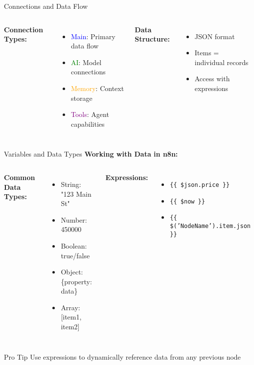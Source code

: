 \documentclass{beamer}
\begin{document}
\begin{frame}{Connections and Data Flow}
  \begin{columns}[onlytextwidth]
      \textbf{Connection Types:}
      \begin{itemize}
        \item \textcolor{blue}{Main}: Primary data flow
        \item \textcolor{green}{AI}: Model connections
        \item \textcolor{orange}{Memory}: Context storage
        \item \textcolor{purple}{Tools}: Agent capabilities
      \end{itemize}
      
      \vspace{0.3cm}
      \textbf{Data Structure:}
      \begin{itemize}
        \item JSON format
        \item Items = individual records
        \item Access with expressions
      \end{itemize}
  \end{columns}
\end{frame}

\begin{frame}{Variables and Data Types}
  \textbf{Working with Data in n8n:}
  
  \begin{columns}[onlytextwidth]
      \textbf{Common Data Types:}
      \begin{itemize}
        \item String: "123 Main St"
        \item Number: 450000
        \item Boolean: true/false
        \item Object: \{property: data\}
        \item Array: [item1, item2]
      \end{itemize}
    
      \textbf{Expressions:}
      \begin{itemize}
        \item \texttt{\{\{ \$json.price \}\}}
        \item \texttt{\{\{ \$now \}\}}
        \item \texttt{\{\{ \$('NodeName').item.json \}\}}
      \end{itemize}
  \end{columns}
  
  \vspace{0.3cm}
  \begin{block}{Pro Tip}
    Use expressions to dynamically reference data from any previous node
  \end{block}
\end{frame}
\end{document}
